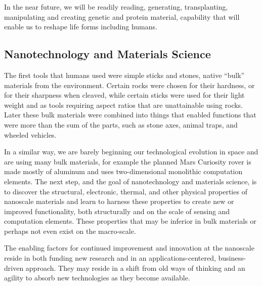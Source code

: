 \documentclass[letter,11pt]{article}
\begin{document}
In the near future, we will be readily reading, generating, transplanting,
manipulating and creating genetic and protein material, capability that will
enable us to reshape life forms including humans.
 

\subsection{Nanotechnology and Materials Science}
\label{et-nano}

The first tools that humans used were simple sticks and stones, native ``bulk''
materials from the environment. Certain rocks were chosen for their hardness,
or for their sharpness when cleaved, while certain sticks were used for their
light weight and as tools requiring aspect ratios that are unattainable using
rocks. Later these bulk materials were combined into things that enabled
functions that were more than the sum of the parts, such as stone axes, animal
traps, and wheeled vehicles.

In a similar way, we are barely beginning our technological evolution in space
and are using many bulk materials, for example the planned Mars Curiosity rover
is made mostly of aluminum and uses two-dimensional monolithic computation
elements. The next step, and the goal of nanotechnology and materials science,
is to discover the structural, electronic, thermal, and other physical
properties of nanoscale materials and learn to harness these properties to
create new or improved functionality, both structurally and on the scale of
sensing and computation elements. These properties that may be inferior in bulk
materials or perhaps not even exist on the macro-scale.

The enabling factors for continued improvement and innovation at the nanoscale
reside in both funding new research and in an applications-centered,
business-driven approach. They may reside in a shift from old ways of thinking
and an agility to absorb new technologies as they become available.
\end{document}
